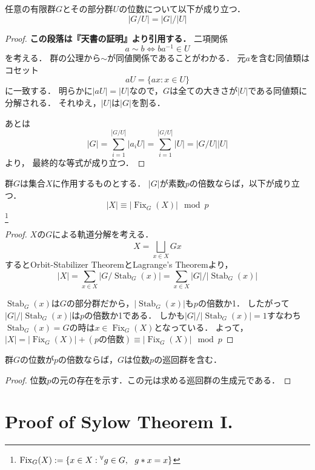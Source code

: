 \documentclass[a4paper]{jsarticle}
\newcommand{\Stab}{\operatorname{Stab}}
\newcommand{\Fix}{\operatorname{Fix}}
\begin{document}
    \begin{Them}
        任意の有限群$G$とその部分群$U$の位数について以下が成り立つ．
        \[ |G/U|=|G|/|U| \]
    \end{Them}
    \begin{proof}
        \textbf{この段落は『天書の証明』より引用する．}
        二項関係\[ a \sim b \iff ba^{-1} \in U \]を考える．
        群の公理から$\sim$が同値関係であることがわかる．
        元$a$を含む同値類はコセット\[ aU=\{ ax : x \in U \} \]に一致する．
        明らかに$|aU|=|U|$なので，$G$は全ての大きさが$|U|$である同値類に分解される．
        それゆえ，$|U|$は$|G|$を割る．

        あとは
        \[ |G|=\sum_{i=1}^{|G/U|}{|a_i U|}=\sum_{i=1}^{|G/U|}{|U|}=|G/U||U| \]より，
        最終的な等式が成り立つ．
        
    \end{proof}

    \begin{Lemma}
        群$G$は集合$X$に作用するものとする．
        $|G|$が素数$p$の倍数ならば，以下が成り立つ．
        \[ |X| \equiv |\Fix_G(X)| \mod p\]
        \footnote{$\Fix_G(X):=\{x \in X : \Forall{g \in G} g \ast x=x \}$}
    \end{Lemma}
    \begin{proof}
        $X$の$G$による軌道分解を考える．
        \[ X= \bigsqcup_{x \in X}{Gx} \]
        するとOrbit-Stabilizer TheoremとLagrange's Theoremより，
        \[ |X| = \sum_{x \in X}{|G/ \Stab_G(x)|} = \sum_{x \in X}{|G|/|\Stab_G(x)|}\]

        $\Stab_G(x)$は$G$の部分群だから，$|\Stab_G(x)|$も$p$の倍数か1．
        したがって$|G|/|\Stab_G(x)|$は$p$の倍数か1である．
        しかも$|G|/|\Stab_G(x)|=1$すなわち$\Stab_G(x)=G$の時は$x \in \Fix_G(X)$となっている．
        よって，$|X|=|\Fix_G(X)|+(p\mbox{の倍数}) \equiv |\Fix_G(X)| \mod p$
        
    \end{proof}

    \begin{Them}
        群$G$の位数が$p$の倍数ならば，$G$は位数$p$の巡回群を含む．
    \end{Them}
    \begin{proof}
        位数$p$の元の存在を示す．この元は求める巡回群の生成元である．
    \end{proof}

\section{Proof of Sylow Theorem I.}
\end{document}

